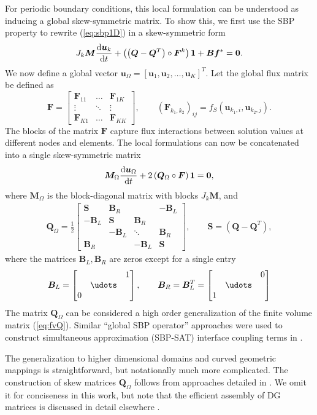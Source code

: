 \documentclass{article}
\newcommand{\td}[2]{\frac{{\rm d}#1}{{\rm d}{ {#2}}}}
\newcommand{\LRp}[1]{\left( #1 \right)}
\newcommand{\LRs}[1]{\left[ #1 \right]}
\newcommand{\eqlab}[1]{\begin{align}#1\end{align}}
\newcommand{\bmat}[1]{\begin{bmatrix}#1\end{bmatrix}}
\begin{document}
For periodic boundary conditions, this local formulation can be understood as inducing a global skew-symmetric matrix.  To show this, we first use the SBP property to rewrite (\ref{eq:sbp1D}) in a skew-symmetric form \cite{chan2019skew}
\eqlab{
J_k {\bm{M}} \td{\bm{u}_k}{t} + \LRp{\LRp{\bm{Q}-\bm{Q}^T} \circ \bm{F}^k}\bm{1} + \bm{B}\bm{f}^* = \bm{0}.
\label{eq:sbp1D}
}
We now define a global vector $\bm{u}_{\Omega} = \LRs{\bm{u}_1, \bm{u}_2, \ldots, \bm{u}_K}^T$.  Let the global flux matrix be defined as
\[
\bm{F} = \bmat{
\bm{F}_{11} & \ldots & \bm{F}_{1K}\\
\vdots & \ddots & \vdots\\
\bm{F}_{K1} & \ldots & \bm{F}_{KK}
}, \qquad \LRp{\bm{F}_{k_1,k_2}}_{ij} = f_S(\bm{u}_{k_1,i}, \bm{u}_{k_2,j}).
\]
The blocks of the matrix $\bm{F}$ capture flux interactions between solution values at different nodes and elements.  
The local formulations can now be concatenated into a single skew-symmetric matrix
\[
\bm{M}_{\Omega}\td{\bm{u}_{\Omega}}{t} + 2\LRp{\bm{Q}_{\Omega}\circ \bm{F}}\bm{1} = \bm{0},
\]
where $\bm{M}_{\Omega}$ is the block-diagonal matrix with blocks $J_k\bm{M}$, and 
\eqlab{
\bm{Q}_{\Omega} = \frac{1}{2}\bmat{
\bm{S} &\bm{B}_R & & -\bm{B}_L\\
-\bm{B}_L& \bm{S} & \bm{B}_R&\\
& -\bm{B}_L & \ddots & \bm{B}_R\\
\bm{B}_R& & -\bm{B}_L & \bm{S}
}, \qquad \bm{S} = \LRp{\bm{Q}-\bm{Q}^T},
\label{eq:sbpmat}
}
where the matrices $\bm{B}_L,\bm{B}_R$ are zeros except for a single entry
\[
\bm{B}_L = \bmat{
 & &1\\
& \udots & \\
0 & & 
}, \qquad \bm{B}_R = \bm{B}_L^T = \bmat{
 & & 0\\
& \udots & \\
1 & & 
}
\]
The matrix $\bm{Q}_{\Omega}$ can be considered a high order generalization of the finite volume matrix (\ref{eq:fvQ}).  Similar ``global SBP operator'' approaches were used to construct simultaneous approximation (SBP-SAT) interface coupling terms in \cite{crean2018entropy, chan2018efficient, fernandez2019entropy}.  

The generalization to higher dimensional domains and curved geometric mappings is straightforward, but notationally much more complicated.  The construction of skew matrices $\bm{Q}_{\Omega}$ follows from approaches detailed in \cite{crean2018entropy, chan2017discretely, chan2018discretely, chan2018efficient, chan2019skew, hicken2020entropy}.  We omit it for conciseness in this work, but note that the efficient assembly of DG matrices is discussed in detail elsewhere \cite{persson2008newton, hillewaert2011sharp, kempf2018automatic}.  
\end{document}
